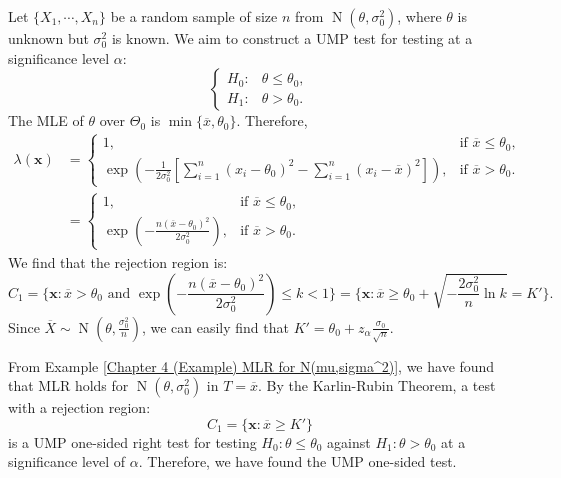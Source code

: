 \documentclass{huhtakm-template-book-v2}
\DeclareMathOperator{\N}{N}
\begin{document}
    \begin{eg}
        Let $\{X_{1},\cdots,X_{n}\}$ be a random sample of size $n$ from $\N(\theta,\sigma_{0}^{2})$, where $\theta$ is unknown but $\sigma_{0}^{2}$ is known. We aim to construct a UMP test for testing at a significance level $\alpha$:
        \begin{equation*}
            \begin{cases}
                H_{0}: &\theta\leq\theta_{0},\\
                H_{1}: &\theta>\theta_{0}.
            \end{cases}
        \end{equation*}
        The MLE of $\theta$ over $\Theta_{0}$ is $\min\{\overline{x},\theta_{0}\}$. Therefore,
        \begin{align*}
            \lambda(\mathbf{x})&=\begin{cases}
                1, &\text{if }\overline{x}\leq\theta_{0},\\
                \exp\left(-\frac{1}{2\sigma_{0}^{2}}\left[\sum_{i=1}^{n}(x_{i}-\theta_{0})^{2}-\sum_{i=1}^{n}(x_{i}-\overline{x})^{2}\right]\right), &\text{if }\overline{x}>\theta_{0}.
            \end{cases}\\
            &=\begin{cases}
                1, &\text{if }\overline{x}\leq\theta_{0},\\
                \exp\left(-\frac{n(\overline{x}-\theta_{0})^{2}}{2\sigma_{0}^{2}}\right), &\text{if }\overline{x}>\theta_{0}.
            \end{cases}
        \end{align*}
        We find that the rejection region is:
        \begin{equation*}
            C_{1}=\biggl\{\mathbf{x}:\overline{x}>\theta_{0}\text{ and }\exp\left(-\frac{n(\overline{x}-\theta_{0})^{2}}{2\sigma_{0}^{2}}\right)\leq k<1\biggr\}=\biggl\{\mathbf{x}:\overline{x}\geq\theta_{0}+\sqrt{-\frac{2\sigma_{0}^{2}}{n}\ln{k}}=K'\biggr\}.
        \end{equation*}
        Since $\overline{X}\sim\N(\theta,\frac{\sigma_{0}^{2}}{n})$, we can easily find that $K'=\theta_{0}+z_{\alpha}\frac{\sigma_{0}}{\sqrt{n}}$.
        
        From Example \ref{Chapter 4 (Example) MLR for N(mu,sigma^2)}, we have found that MLR holds for $\N(\theta,\sigma_{0}^{2})$ in $T=\overline{x}$. By the Karlin-Rubin Theorem, a test with a rejection region:
        \begin{equation*}
            C_{1}=\{\mathbf{x}:\overline{x}\geq K'\}
        \end{equation*}
        is a UMP one-sided right test for testing $H_{0}:\theta\leq\theta_{0}$ against $H_{1}:\theta>\theta_{0}$ at a significance level of $\alpha$. Therefore, we have found the UMP one-sided test.
    \end{eg}
\end{document}
